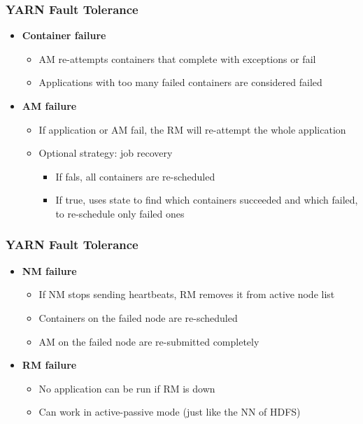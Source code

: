 \begin{frame}
\frametitle{YARN Fault Tolerance}
\begin{itemize}
  \item {\bf Container failure}
  \begin{itemize}
    \item AM re-attempts containers that complete with exceptions or fail
    \item Applications with too many failed containers are considered failed
  \end{itemize}

\vspace{30pt}

  \item {\bf AM failure}
  \begin{itemize}
    \item If application or AM fail, the RM will re-attempt the whole application
    \item Optional strategy: job recovery
    \begin{itemize}
      \item If fals, all containers are re-scheduled
      \item If true, uses state to find which containers succeeded and which failed, to re-schedule only failed ones
    \end{itemize}
  \end{itemize}
\end{itemize}
\end{frame}

\begin{frame}
\frametitle{YARN Fault Tolerance}
\begin{itemize}
  \item {\bf NM failure}
  \begin{itemize}
    \item If NM stops sending heartbeats, RM removes it from active node list
    \item Containers on the failed node are re-scheduled
    \item AM on the failed node are re-submitted completely
  \end{itemize}
  
\vspace{30pt}

  \item {\bf RM failure}
  \begin{itemize}
    \item No application can be run if RM is down
    \item Can work in active-passive mode (just like the NN of HDFS)
  \end{itemize}
\end{itemize}
\end{frame}

